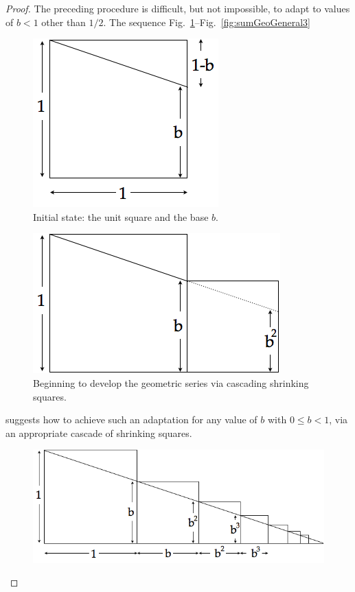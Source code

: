 \begin{proof}
The preceding procedure is difficult, but not impossible, to adapt to values of $b <1$ other than $1/2$.  The sequence Fig.~\ref{fig:sumGeoGeneral1}--Fig.~\ref{fig:sumGeoGeneral3}
\begin{figure}[htb]
\begin{center}
       \includegraphics[scale=0.35]{FiguresMaths/SumGeometricGeneral1}
\caption{Initial state: the unit square and the base $b$.}
       \label{fig:sumGeoGeneral1}
\end{center}
\end{figure}
\begin{figure}[htb]
\begin{center}
       \includegraphics[scale=0.35]{FiguresMaths/SumGeometricGeneral2}
\caption{Beginning to develop the geometric series via cascading shrinking squares.}
       \label{fig:sumGeoGeneral2}
\end{center}
\end{figure}
suggests how to achieve such an adaptation for any value of $b$ with $0 \leq b <1$, via an appropriate cascade of shrinking squares.
\begin{figure}[ht]
\begin{center}
       \includegraphics[scale=0.35]{FiguresMaths/SumGeometricGeneral3}

\end{center}
\end{figure}
\end{proof}
